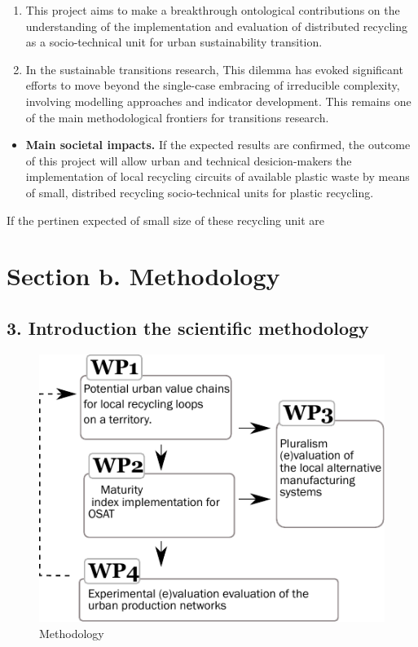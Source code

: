 \documentclass[
  12pt,
  a4paperpaper,
  onecolumn]{article}
\providecommand{\tightlist}{%
  \setlength{\itemsep}{0pt}\setlength{\parskip}{0pt}}\usepackage{longtable,booktabs,array}
\begin{document}
\begin{enumerate}
\def\labelenumi{\arabic{enumi})}
\tightlist
\item
  This project aims to make a breakthrough ontological contributions on
  the understanding of the implementation and evaluation of distributed
  recycling as a socio-technical unit for urban sustainability
  transition.
\item
  In the sustainable transitions research, This dilemma has evoked
  significant efforts to move beyond the single-case embracing of
  irreducible complexity, involving modelling approaches and indicator
  development. This remains one of the main methodological frontiers for
  transitions research.
\end{enumerate}

\begin{itemize}
\tightlist
\item
  \textbf{Main societal impacts.} If the expected results are confirmed,
  the outcome of this project will allow urban and technical
  desicion-makers the implementation of local recycling circuits of
  available plastic waste by means of small, distribed recycling
  socio-technical units for plastic recycling.
\end{itemize}

If the pertinen expected of small size of these recycling unit are

\hypertarget{section-b.-methodology}{%
\section{Section b. Methodology}\label{section-b.-methodology}}

\hypertarget{introduction-the-scientific-methodology}{%
\subsection{3. Introduction the scientific
methodology}\label{introduction-the-scientific-methodology}}

\begin{figure}
\centering
    \includegraphics[width=\linewidth]{Figures/WPs.pdf}
    \caption{Methodology}
    \label{fig:WPs}
\end{figure}
\end{document}
